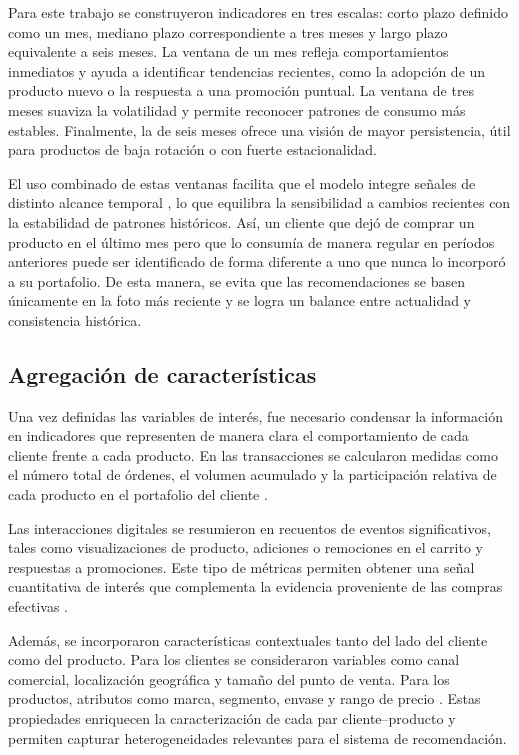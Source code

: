Para este trabajo se construyeron indicadores en tres escalas: corto plazo definido como un mes, mediano plazo correspondiente a tres meses y largo plazo equivalente a seis meses. La ventana de un mes refleja comportamientos inmediatos y ayuda a identificar tendencias recientes, como la adopción de un producto nuevo o la respuesta a una promoción puntual. La ventana de tres meses suaviza la volatilidad y permite reconocer patrones de consumo más estables. Finalmente, la de seis meses ofrece una visión de mayor persistencia, útil para productos de baja rotación o con fuerte estacionalidad.

El uso combinado de estas ventanas facilita que el modelo integre señales de distinto alcance temporal \cite{BOOK:Xiang2010, ARTICLE:Koren2010}, lo que equilibra la sensibilidad a cambios recientes con la estabilidad de patrones históricos. Así, un cliente que dejó de comprar un producto en el último mes pero que lo consumía de manera regular en períodos anteriores puede ser identificado de forma diferente a uno que nunca lo incorporó a su portafolio. De esta manera, se evita que las recomendaciones se basen únicamente en la foto más reciente y se logra un balance entre actualidad y consistencia histórica.

\subsection{Agregación de características}

Una vez definidas las variables de interés, fue necesario condensar la información en indicadores que representen de manera clara el comportamiento de cada cliente frente a cada producto. En las transacciones se calcularon medidas como el número total de órdenes, el volumen acumulado y la participación relativa de cada producto en el portafolio del cliente \cite{ARTICLE:Adomavicius2005}.

Las interacciones digitales se resumieron en recuentos de eventos significativos, tales como visualizaciones de producto, adiciones o remociones en el carrito y respuestas a promociones. Este tipo de métricas permiten obtener una señal cuantitativa de interés que complementa la evidencia proveniente de las compras efectivas \cite{BOOK:Ricci2015}.

Además, se incorporaron características contextuales tanto del lado del cliente como del producto. Para los clientes se consideraron variables como canal comercial, localización geográfica y tamaño del punto de venta. Para los productos, atributos como marca, segmento, envase y rango de precio \cite{BOOK:Aggarwal2016}. Estas propiedades enriquecen la caracterización de cada par cliente–producto y permiten capturar heterogeneidades relevantes para el sistema de recomendación.

